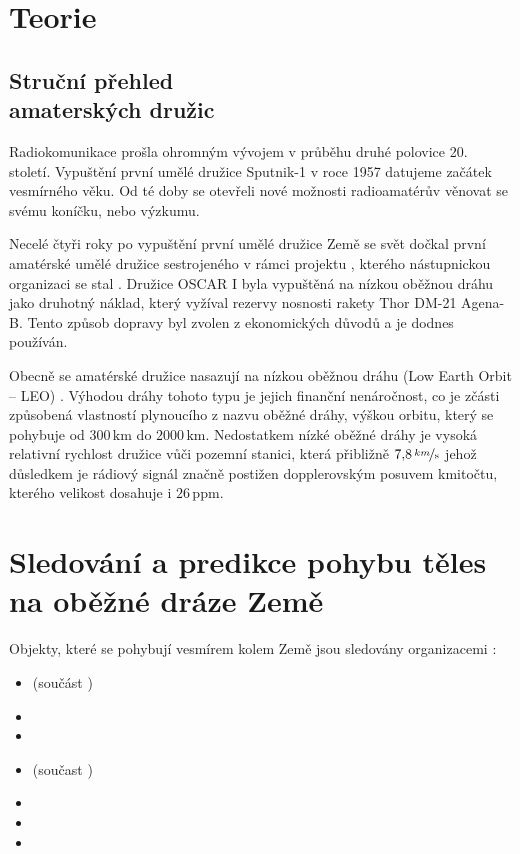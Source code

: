 \chapter{Teorie}
\section[Struční přehled amaterských družic]{Struční přehled\\ amaterských družic}

Radiokomunikace prošla ohromným vývojem v průběhu druhé polovice 20. století. Vypuštění první umělé družice Sputnik-1 v roce 1957 datujeme začátek vesmírného věku. Od té doby se otevřeli nové možnosti radioamatérův věnovat se svému koníčku, nebo výzkumu.

    Necelé čtyři roky po vypuštění první umělé družice Země se svět dočkal první amatérské umělé družice sestrojeného v rámci projektu  \cite{wiki:amateur_sat}, kterého nástupnickou organizaci se stal  \cite{wiki:AMSAT}. Družice OSCAR I byla vypuštěná na nízkou oběžnou dráhu jako druhotný náklad, který vyžíval rezervy nosnosti rakety  Thor DM-21 Agena-B. Tento způsob dopravy byl zvolen z ekonomických důvodů a je dodnes používán.

    Obecně se amatérské družice nasazují na nízkou oběžnou dráhu (Low Earth Orbit -- LEO) \cite{book:ARRL_handbook}. Výhodou dráhy tohoto typu je jejich finanční nenáročnost, co je zčásti způsobená vlastností plynoucího z nazvu oběžné dráhy, výškou orbitu, který se pohybuje od $300\,\mathrm{km}$ do $2000\,\mathrm{km}$. Nedostatkem nízké oběžné dráhy je vysoká relativní rychlost družice vůči pozemní stanici, která přibližně $7{,}8\,\mathrm{\nicefrac{km}{s}}$ \cite{wiki:LEO} jehož důsledkem je rádiový signál značně postižen dopplerovským posuvem kmitočtu, kterého velikost dosahuje i $26\,\mathrm{ppm}$.



\chapter{Sledování a predikce pohybu těles na oběžné dráze Země}

Objekty, které se pohybují vesmírem kolem Země jsou sledovány organizacemi \cite{wiki:derbis}:
\begin{itemize}
    \item {}(součást )
    \item {}
    \item {}
    \item {}(součast )
    \item {}
    \item {}
    \item {}
\end{itemize}

